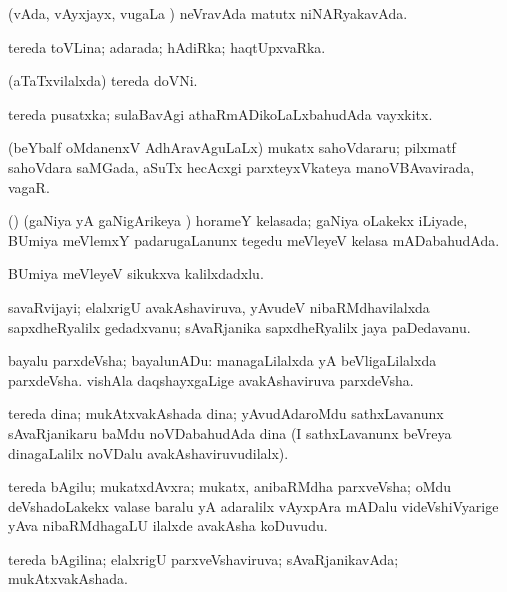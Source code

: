 \bentry
{}
\gl{\gu}
\bmng
(vAda, vAyxjayx, \mo vugaLa \vi) neVravAda matutx niNARyakavAda. 
\emng
\eentry

\bentry
{}
\gl{\gu}
\bmng
tereda toVLina; adarada; hAdiRka; haqtUpxvaRka. 
\emng
\eentry

\bentry
{}
\gl{\nA}
\bmng
(aTaTxvilalxda) tereda doVNi. 
\emng
\eentry

\bentry
{}
\gl{\nA}
\bmng
tereda pusatxka; sulaBavAgi athaRmADikoLaLxbahudAda vayxkitx. 
\emng
\eentry

\bentry
{}
\gl{\nA}
\bmng
(beYbalf oMdanenxV AdhAravAguLaLx) mukatx sahoVdararu; pilxmatf sahoVdara saMGada, aSuTx hecAcxgi parxteyxVkateya manoVBAvavirada, vagaR. 
\emng
\eentry

\bentry
{}
\gl{\gu}
\bmng
(\birx) (gaNiya yA gaNigArikeya \vi) horameY kelasada; gaNiya oLakekx iLiyade, BUmiya meVlemxY padarugaLanunx tegedu meVleyeV kelasa mADabahudAda. 
\emng

\noindent
\gl{\pagu}
\bmng
{} BUmiya meVleyeV sikukxva kalilxdadxlu. 
\emng
\eentry

\bentry
{}
\gl{\nA}
\bmng
savaRvijayi; elalxrigU avakAshaviruva, yAvudeV nibaRMdhavilalxda sapxdheRyalilx gedadxvanu; sAvaRjanika sapxdheRyalilx jaya paDedavanu. 
\emng
\eentry

\bentry
{}
\gl{\nA}
\bmng
bayalu parxdeVsha; bayalunADu: 
\banum
{} managaLilalxda yA beVligaLilalxda parxdeVsha. 
 vishAla daqshayxgaLige avakAshaviruva parxdeVsha. 
\eanum
\emng
\eentry

\bentry
{}
\gl{\nA}
\bmng
tereda dina; mukAtxvakAshada dina; yAvudAdaroMdu sathxLavanunx sAvaRjanikaru baMdu noVDabahudAda dina (I sathxLavanunx beVreya dinagaLalilx noVDalu avakAshaviruvudilalx). 
\emng
\eentry

\bentry
{}
\gl{\nA}
\bmng
tereda bAgilu; mukatxdAvxra; mukatx, anibaRMdha parxveVsha; oMdu deVshadoLakekx valase baralu yA adaralilx vAyxpAra mADalu videVshiVyarige yAva nibaRMdhagaLU ilalxde avakAsha koDuvudu. 
\emng
\eentry

\bentry
{}
\gl{\gu}
\bmng
tereda bAgilina; elalxrigU parxveVshaviruva; sAvaRjanikavAda; mukAtxvakAshada. 
\emng
\eentry

